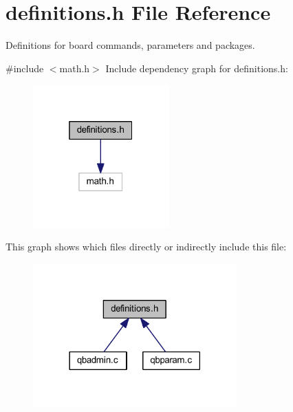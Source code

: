 \section{definitions.\+h File Reference}
\label{definitions_8h}


Definitions for board commands, parameters and packages.  


{\ttfamily \#include $<$math.\+h$>$}\newline
Include dependency graph for definitions.\+h\+:
\nopagebreak
\begin{figure}[H]
\begin{center}
\leavevmode
\includegraphics[width=148pt]{definitions_8h__incl}
\end{center}
\end{figure}
This graph shows which files directly or indirectly include this file\+:
\nopagebreak
\begin{figure}[H]
\begin{center}
\leavevmode
\includegraphics[width=222pt]{definitions_8h__dep__incl}
\end{center}
\end{figure}
